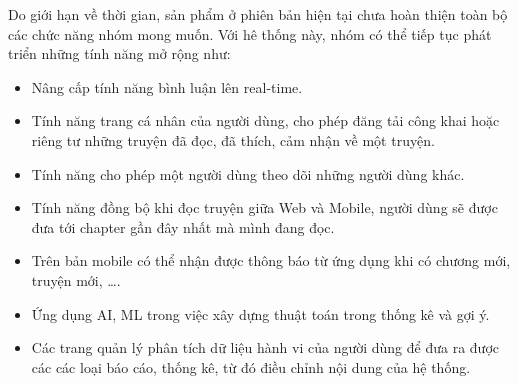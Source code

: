 \documentclass[./../main.tex]{subfiles}
\begin{document}
Do giới hạn về thời gian, sản phẩm ở phiên bản hiện tại chưa hoàn thiện toàn bộ các chức năng nhóm mong muốn. Với hê thống này, nhóm có thể tiếp tục phát triển những tính năng mở rộng như:
\begin{itemize}
	\item Nâng cấp tính năng bình luận lên real-time.
	\item Tính năng trang cá nhân của người dùng, cho phép đăng tải công khai hoặc riêng tư những truyện đã đọc, đã thích, cảm nhận về một truyện.
	\item Tính năng cho phép một người dùng theo dõi những người dùng khác.
	\item Tính năng đồng bộ khi đọc truyện giữa Web và Mobile, người dùng sẽ được đưa tới chapter gần đây nhất mà mình đang đọc.
	\item Trên bản mobile có thể nhận được thông báo từ ứng dụng khi có chương mới, truyện mới, ….
	\item Ứng dụng AI, ML trong việc xây dựng thuật toán trong thống kê và gợi ý.
	\item Các trang quản lý phân tích dữ liệu hành vi của người dùng để đưa ra được các các loại báo cáo, thống kê, từ đó điều chỉnh nội dung của hệ thống.
\end{itemize}
\end{document}
